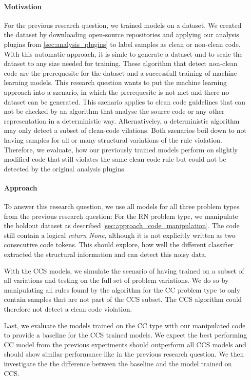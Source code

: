 \paragraph{Motivation}
For the previous research question, we trained models on a dataset. We created the dataset by downloading open-source repositories and applying our analysis plugins from \ref{sec:analysis_plugins} to label samples as clean or non-clean code. With this automatic approach, it is simle to generate a dataset und to scale the dataset to any size needed for training. These algorithm that detect non-clean code are the prerequesite for the dataset and a successfull training of machine learning models. This research question wants to put the machine learning approach into a szenario, in which the prerequesite is not met and there no dataset can be generated. This szenario applies to clean code guidelines that can not be checked by an algorithm that analyse the source code or any other representation in a deterministic way. Alternativeley, a deterministic algorithm may only detect a subset of clean-code vilations. Both szenarios boil down to not having samples for all or many structural variations of the rule violation. Therefore, we evaluate, how our previously trained models perform on slightly modified code that still violates the same clean code rule but could not be detected by the original analysis plugins.


\paragraph{Approach}
To answer this research question, we use all models for all three problem types from the previous research question: For the RN problem type, we manipulate the holdout dataset as described \ref{sec:approach_code_manipulation}. The code still contain a logical \textit{return None}, although it is not explicitly written as two consecutive code tokens. This should explore, how well the different classifier extracted the structural information and can detect this noisy data. 

With the CCS models, we simulate the scenario of having trained on a subset of all variations and testing on the full set of problem variations. We do so by manipulating all rules found by the algorithm for the CC problem type to only contain samples that are not part of the CCS subset. The CCS algorithm could therefore not detect a clean code violation.

Last, we evaluate the models trained on the CC type with our manipulated code to provide a baseline for the CCS trained models. We expect the best performing CC model from the previous experiments should outperform all CCS models and should show similar performance like in the previous research question. We then investigate the the difference between the baseline and the model trained on CCS.

